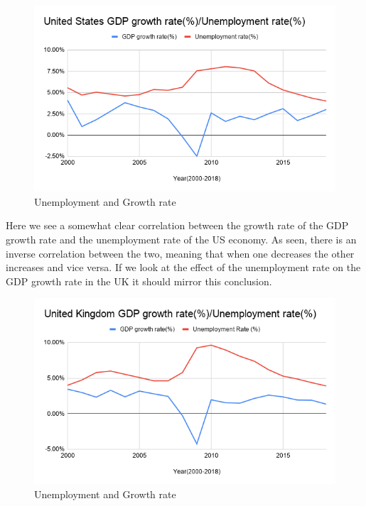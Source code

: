 \begin{figure}[H]
   \centering
   \includegraphics[scale = 0.5]{figures/United_States_GDP_Unemployment}
   \caption{Unemployment and Growth rate\cite{US_Unemployment}\cite{US_Growth_Rate_GDP}}
 \end{figure}

Here we see a somewhat clear correlation between the growth rate of the GDP growth rate and the unemployment rate of the US economy.
As seen, there is an inverse correlation between the two, meaning that when one decreases the other increases and vice versa.
If we look at the effect of the unemployment rate on the GDP growth rate in the UK it should mirror this conclusion. \\

\begin{figure}[H]
   \centering
   \includegraphics[scale = 0.5]{figures/United_Kingdom_GDP_Unemployment}
   \caption{Unemployment and Growth rate\cite{UK_Unemployment}\cite{UK_Growth_Rate_GDP}}
 \end{figure}

